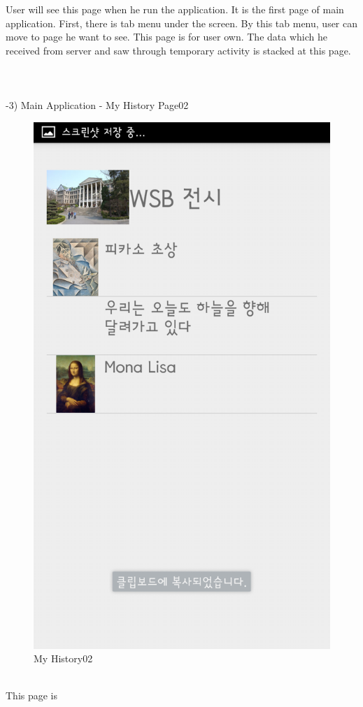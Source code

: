 \documentclass[conference]{IEEEtran}
\begin{document}
\quad User will see this page when he run the application. It is the first page of main application. First, there is tab menu under the screen. By this tab menu, user can move to page he want to see.  This page is for user own. The data which he received from server and saw through temporary activity is stacked at this page. \\\\\\\\

-3) Main Application - My History Page02\\
\begin{figure}[htbp]
\begin{center}
    \includegraphics[scale=0.2]{img_capture05}
    \caption{My History02} 
\end{center}
\end{figure}\\
\quad This page is \\\\\\\\
\end{document}
